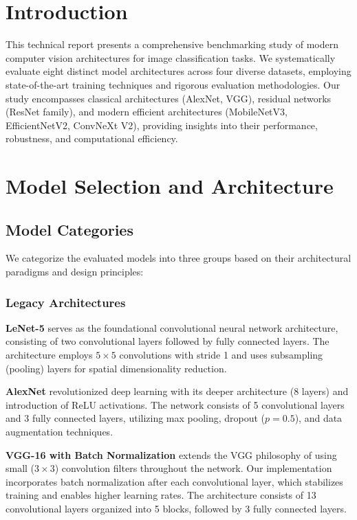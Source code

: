 \section{Introduction}

This technical report presents a comprehensive benchmarking study of modern computer vision architectures for image classification tasks. We systematically evaluate eight distinct model architectures across four diverse datasets, employing state-of-the-art training techniques and rigorous evaluation methodologies. Our study encompasses classical architectures (AlexNet, VGG), residual networks (ResNet family), and modern efficient architectures (MobileNetV3, EfficientNetV2, ConvNeXt V2), providing insights into their performance, robustness, and computational efficiency.

\section{Model Selection and Architecture}

\subsection{Model Categories}

We categorize the evaluated models into three groups based on their architectural paradigms and design principles:

\subsubsection{Legacy Architectures}

\textbf{LeNet-5} serves as the foundational convolutional neural network architecture, consisting of two convolutional layers followed by fully connected layers. The architecture employs $5 \times 5$ convolutions with stride 1 and uses subsampling (pooling) layers for spatial dimensionality reduction.

\textbf{AlexNet} revolutionized deep learning with its deeper architecture (8 layers) and introduction of ReLU activations. The network consists of 5 convolutional layers and 3 fully connected layers, utilizing max pooling, dropout ($p=0.5$), and data augmentation techniques.

\textbf{VGG-16 with Batch Normalization} extends the VGG philosophy of using small ($3 \times 3$) convolution filters throughout the network. Our implementation incorporates batch normalization after each convolutional layer, which stabilizes training and enables higher learning rates. The architecture consists of 13 convolutional layers organized into 5 blocks, followed by 3 fully connected layers.

